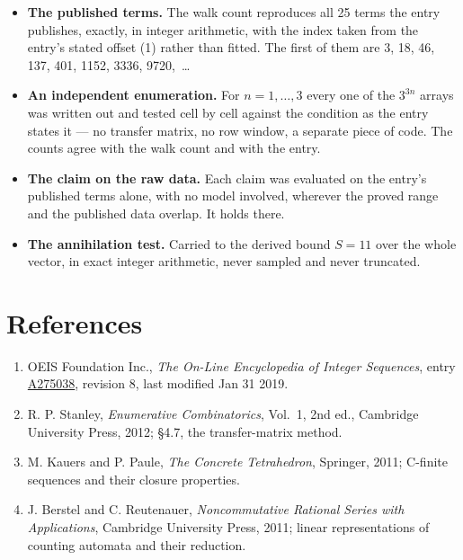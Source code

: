 \documentclass[11pt]{article}
\theoremstyle{definition}
\begin{document}
\begin{itemize}

\item {\bfseries The published terms.} The walk count reproduces all 25 terms the entry publishes, exactly, in integer arithmetic, with the index taken from the entry's stated offset (1) rather than fitted. The first of them are 3, 18, 46, 137, 401, 1152, 3336, 9720,~\dots

\item {\bfseries An independent enumeration.} For $n = 1,\dots,3$ every one of the $3^{3n}$ arrays was written out and tested cell by cell against the condition as the entry states it --- no transfer matrix, no row window, a separate piece of code. The counts agree with the walk count and with the entry.

\item {\bfseries The claim on the raw data.} Each claim was evaluated on the entry's published terms alone, with no model involved, wherever the proved range and the published data overlap. It holds there.

\item {\bfseries The annihilation test.} Carried to the derived bound $S = 11$ over the whole vector, in exact integer arithmetic, never sampled and never truncated.

\end{itemize}

\section{References}

\begin{enumerate}

\item OEIS Foundation Inc., \emph{The On-Line Encyclopedia of Integer Sequences}, entry \href{https://oeis.org/A275038}{A275038}, revision 8, last modified Jan 31 2019.

\item R. P. Stanley, \emph{Enumerative Combinatorics}, Vol.~1, 2nd ed., Cambridge University Press, 2012; \S4.7, the transfer-matrix method.

\item M. Kauers and P. Paule, \emph{The Concrete Tetrahedron}, Springer, 2011; C-finite sequences and their closure properties.

\item J. Berstel and C. Reutenauer, \emph{Noncommutative Rational Series with Applications}, Cambridge University Press, 2011; linear representations of counting automata and their reduction.

\end{enumerate}
\end{document}
